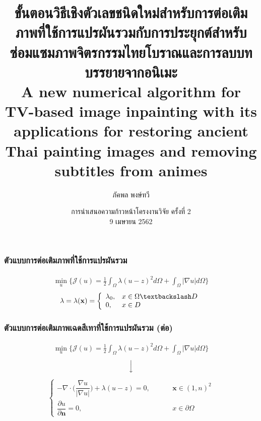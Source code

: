 \documentclass[xcolor=dvipsnames, xetex,serif]{beamer}
\title[วิธีเชิงตัวเลขสำหรับต่อเติมภาพ]{\normalsize{ขั้นตอนวิธีเชิงตัวเลขชนิดใหม่สำหรับการต่อเติมภาพที่ใช้การแปรผันรวมกับการประยุกต์สำหรับซ่อมแซมภาพจิตรกรรมไทยโบราณและการลบบทบรรยายจากอนิเมะ\\A new numerical algorithm for TV-based image inpainting with its applications for restoring ancient Thai painting images and removing subtitles from animes}}
\author[ภัคพล]{ภัคพล พงษ์ทวี}
\institute[SU]{
 	ภาควิชาคณิตศาสตร์\\
 	มหาวิทยาลัยศิลปากร \\}
\date[Project Progression]{การนำเสนอความก้าวหน้าโครงงานวิจัย ครั้งที่ 2\\
 	9 เมษายน 2562}
\numberwithin{equation}{section}
\begin{document}
	\begin{frame}
 		\titlepage 
	\end{frame}	 
	\begin{frame}
		\frametitle{ตัวแบบการต่อเติมภาพที่ใช้การแปรผันรวม}
		\begin{align*}
		\min_{u} \{ \mathcal{J}(u) = \frac{1}{2} \int_{\Omega}\lambda (u-z)^2 d\Omega +  \int_{\Omega}  |\nabla u|  d\Omega \}
		\end{align*}
		 \vspace{1cm}
		\begin{align*}
		\lambda=\lambda(\mathbf{x}) = \left \{ \begin{array}{ll}  \lambda_0, & x \in \Omega \textbackslash D \\ 0, & x \in D  \end{array} \right . 
		\end{align*}
		\let\thefootnote\relax{}	
	\end{frame} 
	\begin{frame}
		\frametitle{ตัวแบบการต่อเติมภาพเฉดสีเทาที่ใช้การแปรผันรวม (ต่อ)}
		\begin{align*}
		\min_{u} \{ \mathcal{J}(u) = \frac{1}{2} \int_{\Omega}\lambda (u-z)^2 d\Omega +  \int_{\Omega}  |\nabla u|  d\Omega \}
		\end{align*}
		$$ \Big \downarrow$$
		\begin{align*}
		\left \{ \begin{array}{ll}  - \nabla \cdot  \Big( \dfrac{\nabla u}{|\nabla u|} \Big) + \lambda (u-z) = 0,  & \hspace{1cm} \mathbf{x} \in (1,n)^2 \\ \dfrac{\partial u}{\partial \boldsymbol{n}} = 0, & \hspace{1cm} x \in \partial \Omega \end{array} \right .
		\end{align*}			
	\end{frame} 
\end{document}
